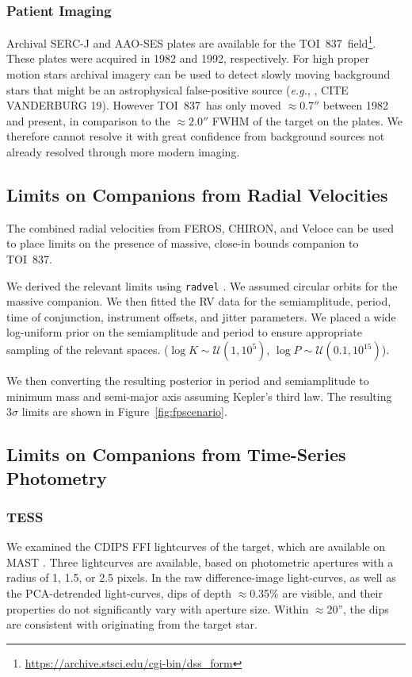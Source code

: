 \documentclass[12pt,twocolumn,tighten]{aastex62}
\newcommand{\tn}{TOI~837} %
\begin{document}
\subsubsection{Patient Imaging}
    Archival SERC-J and AAO-SES plates are available for the \tn\
field\footnote{\url{https://archive.stsci.edu/cgi-bin/dss_form}}.
These plates were acquired in 1982 and 1992, respectively.
For high proper motion stars archival imagery can be used to
detect slowly moving background stars that might be an
astrophysical false-positive source
({\it e.g.}, \citealt{huang_pimen_2018}, CITE VANDERBURG 19).
However \tn\ has only moved $\approx0.7''$ between 1982 and
present, in comparison to the $\approx2.0''$ FWHM of the target on
the plates.
We therefore cannot resolve it with great confidence from
background sources not already resolved through more modern
imaging.

\subsection{Limits on Companions from Radial Velocities}

The combined radial velocities from FEROS, CHIRON, and Veloce 
can be used to place limits on the presence of massive, close-in
bounds companion to \tn.

We derived the relevant limits using \texttt{radvel} \citep{fulton_radvel_2018}.
We assumed circular orbits for the massive companion.
We then fitted the RV data for the semiamplitude, period, time
of conjunction,
instrument offsets, and jitter parameters.
We placed a wide log-uniform prior on the semiamplitude
and period to ensure appropriate sampling of the relevant
spaces.
($\log K \sim \mathcal{U}(1,10^5)$, $\log P \sim \mathcal{U}(0.1, 10^{15})$).

We then converting the resulting posterior in period and semiamplitude
to minimum mass and semi-major axis assuming Kepler's third law.
The resulting $3\sigma$ limits are shown in Figure~\ref{fig:fpscenario}.


\subsection{Limits on Companions from Time-Series Photometry}

\subsubsection{TESS}
We examined the CDIPS FFI lightcurves of the target, which are
available on MAST \citep{bouma_cluster_2019}. Three lightcurves are
available, based on photometric apertures with a radius of 1, 1.5, or
2.5 pixels.  In the raw difference-image light-curves, as well as the
PCA-detrended light-curves, dips of depth $\approx$0.35\% are visible,
and their properties do not significantly vary with aperture size.
Within $\approx20$'', the dips are consistent with originating from
the target star.
\end{document}

